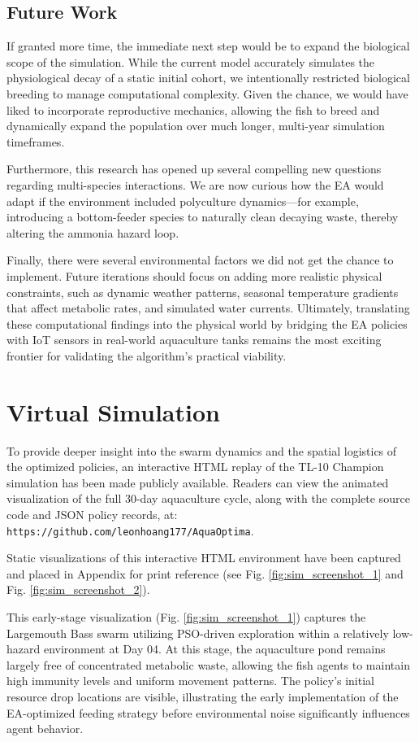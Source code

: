 \documentclass[conference]{IEEEtran}
\begin{document}
\subsection{Future Work}
If granted more time, the immediate next step would be to expand the biological scope of the simulation. While the current model accurately simulates the physiological decay of a static initial cohort, we intentionally restricted biological breeding to manage computational complexity. Given the chance, we would have liked to incorporate reproductive mechanics, allowing the fish to breed and dynamically expand the population over much longer, multi-year simulation timeframes.

Furthermore, this research has opened up several compelling new questions regarding multi-species interactions. We are now curious how the EA would adapt if the environment included polyculture dynamics—for example, introducing a bottom-feeder species to naturally clean decaying waste, thereby altering the ammonia hazard loop. 

Finally, there were several environmental factors we did not get the chance to implement. Future iterations should focus on adding more realistic physical constraints, such as dynamic weather patterns, seasonal temperature gradients that affect metabolic rates, and simulated water currents. Ultimately, translating these computational findings into the physical world by bridging the EA policies with IoT sensors in real-world aquaculture tanks remains the most exciting frontier for validating the algorithm's practical viability.

\section{Virtual Simulation}
To provide deeper insight into the swarm dynamics and the spatial logistics of the optimized policies, an interactive HTML replay of the TL-10 Champion simulation has been made publicly available. Readers can view the animated visualization of the full 30-day aquaculture cycle, along with the complete source code and JSON policy records, at: \texttt{https://github.com/leonhoang177/AquaOptima}.

Static visualizations of this interactive HTML environment have been captured and placed in Appendix for print reference (see Fig. \ref{fig:sim_screenshot_1} and Fig. \ref{fig:sim_screenshot_2}).

This early-stage visualization (Fig. \ref{fig:sim_screenshot_1}) captures the Largemouth Bass swarm utilizing PSO-driven exploration within a relatively low-hazard environment at Day 04. At this stage, the aquaculture pond remains largely free of concentrated metabolic waste, allowing the fish agents to maintain high immunity levels and uniform movement patterns. The policy's initial resource drop locations are visible, illustrating the early implementation of the EA-optimized feeding strategy before environmental noise significantly influences agent behavior.
\end{document}
